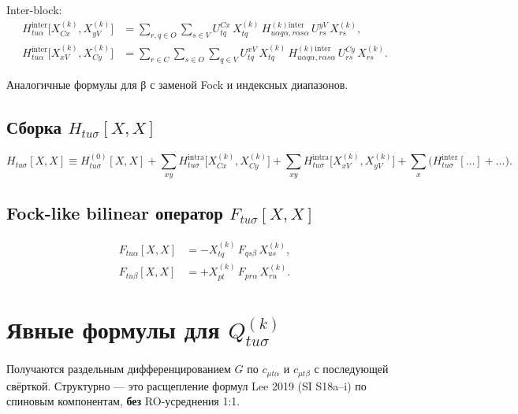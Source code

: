 \documentclass[11pt, a4paper]{article}
\theoremstyle{definition}
\newcommand{\Xk}[2]{X^{(#1)}_{#2}}
\newcommand{\Hintra}{H^{\text{intra}}}
\newcommand{\Hinter}{H^{\text{inter}}}
\newcommand{\Hkinter}{H^{(k)\text{inter}}}
\begin{document}
Inter-block:
\begin{align}
    \Hinter_{tu\alpha}\bigl[\Xk{k}{Cx}, \Xk{k}{yV}\bigr] &= \sum_{r, q \in O} \sum_{s \in V} U^{Cx}_{tq}\, \Xk{k}{tq}\, \Hkinter_{u\alpha q\alpha, r\alpha s\alpha}\, U^{yV}_{rs}\, \Xk{k}{rs}, \\
    \Hinter_{tu\alpha}\bigl[\Xk{k}{xV}, \Xk{k}{Cy}\bigr] &= \sum_{r \in C} \sum_{s \in O} \sum_{q \in V} U^{xV}_{tq}\, \Xk{k}{tq}\, \Hkinter_{u\alpha q\alpha, r\alpha s\alpha}\, U^{Cy}_{rs}\, \Xk{k}{rs}.
\end{align}

Аналогичные формулы для β с заменой Fock и индексных диапазонов.

\subsection{Сборка $H_{tu\sigma}[X, X]$}

\begin{equation}
    H_{tu\sigma}[X, X] \equiv H^{(0)}_{tu\sigma}[X, X] + \sum_{xy} \Hintra_{tu\sigma}\bigl[\Xk{k}{Cx}, \Xk{k}{Cy}\bigr] + \sum_{xy} \Hintra_{tu\sigma}\bigl[\Xk{k}{xV}, \Xk{k}{yV}\bigr] + \sum_x \bigl( \Hinter_{tu\sigma}[\ldots] + \ldots \bigr).
    \label{eq:Hfull}
\end{equation}

\subsection{Fock-like bilinear оператор $F_{tu\sigma}[X, X]$}

\begin{align}
    F_{tu\alpha}[X, X] &= -\Xk{k}{tq}\, F_{qs\beta}\, \Xk{k}{us}, \label{eq:FX} \\
    F_{tu\beta}[X, X] &= +\Xk{k}{pt}\, F_{pr\alpha}\, \Xk{k}{ru}.
\end{align}

\section{Явные формулы для $Q^{(k)}_{tu\sigma}$}
\label{sec:Qexplicit}

Получаются раздельным дифференцированием $G$ по $c_{\mu t \alpha}$ и $c_{\mu t \beta}$ с последующей свёрткой. Структурно --- это расщепление формул Lee 2019 (SI S18a--i) по спиновым компонентам, \textbf{без} RO-усреднения 1:1.
\end{document}
